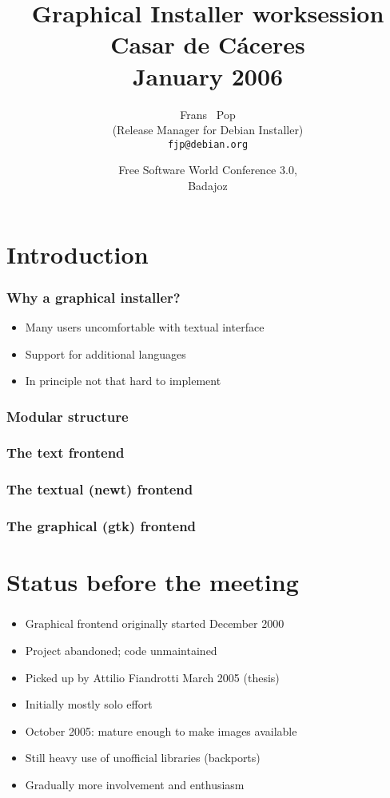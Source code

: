 \documentclass{beamer}
\title[Extremadura worksessions - Graphical Installer] %
{Graphical Installer worksession\\Casar de C\'{a}ceres\\January 2006}
\author[Frans Pop] %
{Frans ~Pop \\ (Release Manager for Debian Installer) \\ \texttt{fjp@debian.org}}
\date[FSWC 3.0, 2007] %
{Free Software World Conference 3.0,\\Badajoz}
\begin{document}
\begin{frame}
  \titlepage
\end{frame}

\begin{frame}
  \tableofcontents
\end{frame}


\section{Introduction}

\begin{frame}
  \frametitle{Why a graphical installer?}
	\begin{itemize}
	\item
		Many users uncomfortable with textual interface
	\item
		Support for additional languages
	\item
		In principle not that hard to implement
	\end{itemize}
\end{frame}

\begin{frame}[plain]
  \frametitle{Modular structure}
\end{frame}

\begin{frame}[plain]
  \frametitle{The text frontend}
\end{frame}

\begin{frame}[plain]
  \frametitle{The textual (newt) frontend}
\end{frame}

\begin{frame}[plain]
  \frametitle{The graphical (gtk) frontend}
\end{frame}

\section{Status before the meeting}

\begin{frame}
  \frametitle{}
	\begin{itemize}
	\item
		Graphical frontend originally started December 2000
	\item
		Project abandoned; code unmaintained
	\item
		Picked up by Attilio Fiandrotti March 2005 (thesis)
	\item
		Initially mostly solo effort
	\item
		October 2005: mature enough to make images available
	\item
		Still heavy use of unofficial libraries (backports)
	\item
		Gradually more involvement and enthusiasm
	\end{itemize}
\end{frame}
\end{document}
